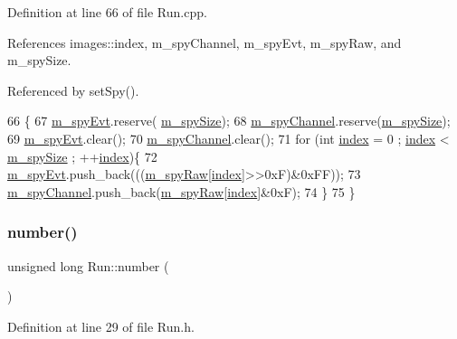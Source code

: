 Definition at line 66 of file Run.\+cpp.



References images\+::index, m\+\_\+spy\+Channel, m\+\_\+spy\+Evt, m\+\_\+spy\+Raw, and m\+\_\+spy\+Size.



Referenced by set\+Spy().


\begin{DoxyCode}
66                      \{
67   \hyperlink{classRun_ae812e1695eafeb95fb54594047e98d95}{m\_spyEvt}.reserve( \hyperlink{classRun_a343bd5a0475c262da9b366933cf3a523}{m\_spySize});
68   \hyperlink{classRun_abe97602a3597cc941906069386a8d9aa}{m\_spyChannel}.reserve(\hyperlink{classRun_a343bd5a0475c262da9b366933cf3a523}{m\_spySize});
69   \hyperlink{classRun_ae812e1695eafeb95fb54594047e98d95}{m\_spyEvt}.clear();
70   \hyperlink{classRun_abe97602a3597cc941906069386a8d9aa}{m\_spyChannel}.clear();
71   \textcolor{keywordflow}{for} (\textcolor{keywordtype}{int} \hyperlink{namespaceimages_a54407fd574970b3178647ae096321a57}{index} = 0 ; \hyperlink{namespaceimages_a54407fd574970b3178647ae096321a57}{index} < \hyperlink{classRun_a343bd5a0475c262da9b366933cf3a523}{m\_spySize} ; ++\hyperlink{namespaceimages_a54407fd574970b3178647ae096321a57}{index})\{
72     \hyperlink{classRun_ae812e1695eafeb95fb54594047e98d95}{m\_spyEvt}.push\_back(((\hyperlink{classRun_a825ab81f2a93f291878235dc13536688}{m\_spyRaw}[\hyperlink{namespaceimages_a54407fd574970b3178647ae096321a57}{index}]>>0xF)&0xFF));
73     \hyperlink{classRun_abe97602a3597cc941906069386a8d9aa}{m\_spyChannel}.push\_back(\hyperlink{classRun_a825ab81f2a93f291878235dc13536688}{m\_spyRaw}[\hyperlink{namespaceimages_a54407fd574970b3178647ae096321a57}{index}]&0xF);
74   \}
75 \}
\end{DoxyCode}
\mbox{\label{classRun_aab2f7571f6348643011d538d05200f46}} 
\subsubsection{\texorpdfstring{number()}{number()}}
{\footnotesize\ttfamily unsigned long Run\+::number (\begin{DoxyParamCaption}{ }\end{DoxyParamCaption})\hspace{0.3cm}{\ttfamily [inline]}}



Definition at line 29 of file Run.\+h.


